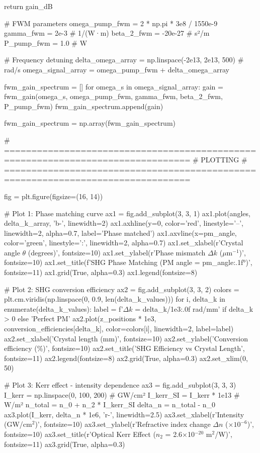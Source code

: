 \documentclass[a4paper, 11pt]{article}
\begin{document}
\begin{pycode}
    return gain_dB

# FWM parameters
omega_pump_fwm = 2 * np.pi * 3e8 / 1550e-9
gamma_fwm = 2e-3  # 1/(W·m)
beta_2_fwm = -20e-27  # s²/m
P_pump_fwm = 1.0  # W

# Frequency detuning
delta_omega_array = np.linspace(-2e13, 2e13, 500)  # rad/s
omega_signal_array = omega_pump_fwm + delta_omega_array

fwm_gain_spectrum = []
for omega_s in omega_signal_array:
    gain = fwm_gain(omega_s, omega_pump_fwm, gamma_fwm, beta_2_fwm, P_pump_fwm)
    fwm_gain_spectrum.append(gain)

fwm_gain_spectrum = np.array(fwm_gain_spectrum)

# ================================================================================
# PLOTTING
# ================================================================================

fig = plt.figure(figsize=(16, 14))

# Plot 1: Phase matching curve
ax1 = fig.add_subplot(3, 3, 1)
ax1.plot(angles, delta_k_array, 'b-', linewidth=2)
ax1.axhline(y=0, color='red', linestyle='--', linewidth=2, alpha=0.7, label='Phase matched')
ax1.axvline(x=pm_angle, color='green', linestyle=':', linewidth=2, alpha=0.7)
ax1.set_xlabel(r'Crystal angle $\theta$ (degrees)', fontsize=10)
ax1.set_ylabel(r'Phase mismatch $\Delta k$ ($\mu$m$^{-1}$)', fontsize=10)
ax1.set_title(f'SHG Phase Matching (PM angle = {pm_angle:.1f}°)', fontsize=11)
ax1.grid(True, alpha=0.3)
ax1.legend(fontsize=8)

# Plot 2: SHG conversion efficiency
ax2 = fig.add_subplot(3, 3, 2)
colors = plt.cm.viridis(np.linspace(0, 0.9, len(delta_k_values)))
for i, delta_k in enumerate(delta_k_values):
    label = f'$\Delta k$ = {delta_k/1e3:.0f} rad/mm' if delta_k > 0 else 'Perfect PM'
    ax2.plot(z_positions * 1e3, conversion_efficiencies[delta_k],
            color=colors[i], linewidth=2, label=label)
ax2.set_xlabel('Crystal length (mm)', fontsize=10)
ax2.set_ylabel('Conversion efficiency (\%)', fontsize=10)
ax2.set_title('SHG Efficiency vs Crystal Length', fontsize=11)
ax2.legend(fontsize=8)
ax2.grid(True, alpha=0.3)
ax2.set_xlim(0, 50)

# Plot 3: Kerr effect - intensity dependence
ax3 = fig.add_subplot(3, 3, 3)
I_kerr = np.linspace(0, 100, 200)  # GW/cm²
I_kerr_SI = I_kerr * 1e13  # W/m²
n_total = n_0 + n_2 * I_kerr_SI
delta_n = n_total - n_0
ax3.plot(I_kerr, delta_n * 1e6, 'r-', linewidth=2.5)
ax3.set_xlabel(r'Intensity (GW/cm$^2$)', fontsize=10)
ax3.set_ylabel(r'Refractive index change $\Delta n$ ($\times 10^{-6}$)', fontsize=10)
ax3.set_title(r'Optical Kerr Effect ($n_2$ = 2.6$\times$10$^{-20}$ m$^2$/W)', fontsize=11)
ax3.grid(True, alpha=0.3)


\end{pycode}
\end{document}
